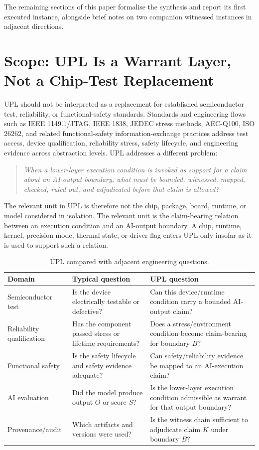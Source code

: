 \documentclass[11pt, a4paper]{article}
\theoremstyle{upldef}
\begin{document}
The remaining sections of this paper formalise the synthesis and
report its first executed instance, alongside brief notes on two
companion witnessed instances in adjacent directions.

\section{Scope: UPL Is a Warrant Layer, Not a Chip-Test Replacement}
\label{sec:scope}

UPL should not be interpreted as a replacement for established
semiconductor test, reliability, or functional-safety standards.
Standards and engineering flows such as IEEE 1149.1/JTAG,
IEEE 1838, JEDEC stress methods, AEC-Q100, ISO 26262, and related
functional-safety information-exchange practices address test
access, device qualification, reliability stress, safety lifecycle,
and engineering evidence across abstraction levels. UPL addresses
a different problem:

\begin{quote}\itshape
When a lower-layer execution condition is invoked as support for a
claim about an AI-output boundary, what must be bounded, witnessed,
mapped, checked, ruled out, and adjudicated before that claim is
allowed?
\end{quote}

The relevant unit in UPL is therefore not the chip, package, board,
runtime, or model considered in isolation. The relevant unit is the
claim-bearing relation between an execution condition and an
AI-output boundary. A chip, runtime, kernel, precision mode,
thermal state, or driver flag enters UPL only insofar as it is used
to support such a relation.

\renewcommand{\arraystretch}{1.25}
\begin{table}[t]
\centering
\caption{UPL compared with adjacent engineering questions.}
\label{tab:scope}
\small
\begin{tabularx}{\textwidth}{l X X}
\toprule
\textbf{Domain} & \textbf{Typical question} & \textbf{UPL question} \\
\midrule
Semiconductor test & Is the device electrically testable or defective? & Can this device/runtime condition carry a bounded AI-output claim? \\
Reliability qualification & Has the component passed stress or lifetime requirements? & Does a stress/environment condition become claim-bearing for boundary $B$? \\
Functional safety & Is the safety lifecycle and safety evidence adequate? & Can safety/reliability evidence be mapped to an AI-execution claim? \\
AI evaluation & Did the model produce output $O$ or score $S$? & Is the lower-layer execution condition admissible as warrant for that output boundary? \\
Provenance/audit & Which artifacts and versions were used? & Is the witness chain sufficient to adjudicate claim $K$ under boundary $B$? \\
\bottomrule
\end{tabularx}
\end{table}
\end{document}
